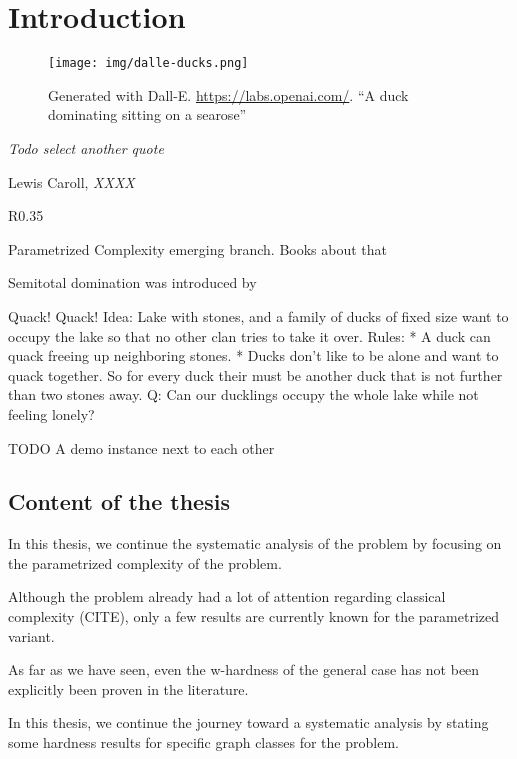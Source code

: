 \chapter{Introduction}\label{ch:introduction}

\vspace*{-50pt}

\begin{figure}[ht]
        \texttt{[image: img/dalle-ducks.png]}
        \captionsetup{textformat=empty,labelformat=blank}
        \caption{Generated with Dall-E. \url{https://labs.openai.com/}. ``A duck dominating sitting on a searose''}
\end{figure}

\epigraph{\itshape Todo select another quote}{Lewis Caroll, \textit{XXXX}}

\begin{wrapfigure}{R}{0.35\textwidth}
\end{wrapfigure}

Parametrized Complexity emerging branch. Books about that

Semitotal domination was introduced by 

Quack! Quack! Idea:  Lake with stones, and a family of ducks of fixed size want to occupy the lake so that no other clan tries to take it over.
Rules: 
* A duck can quack freeing up neighboring stones.
* Ducks don't like to be alone and want to quack together. So for every duck their must be another duck that is not further than two stones away.
Q: Can our ducklings occupy the whole lake while not feeling lonely?


TODO A demo instance next to each other 

\section{Content of the thesis}

In this thesis, we continue the systematic analysis of the \sdom problem by focusing on the parametrized complexity of the problem. 

Although the problem already had a lot of attention regarding classical complexity (CITE), only a few results are currently known for the parametrized variant. 

As far as we have seen, even the w-hardness of the general case has not been explicitly been proven in the literature. 

In this thesis, we continue the journey toward a systematic analysis by stating some hardness results for specific graph classes for the problem.

